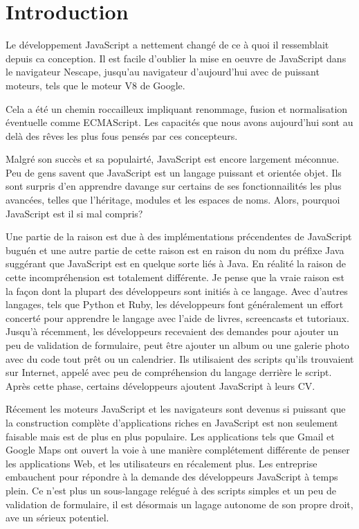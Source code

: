 \chapter{Introduction}
\label{ch:introduction}

Le développement JavaScript a nettement changé de ce à quoi il ressemblait depuis ca conception. Il est facile d’oublier la mise en oeuvre de JavaScript dans le navigateur Nescape, jusqu’au navigateur d’aujourd’hui avec de puissant moteurs, tels que le moteur V8 de Google.

Cela a été un chemin roccailleux impliquant renommage, fusion et normalisation éventuelle comme ECMAScript. Les capacités que nous avons aujourd’hui sont au delà des rêves les plus fous pensés par ces concepteurs.

Malgré son succès et sa populairté, JavaScript est encore largement méconnue. Peu de gens savent que JavaScript est un langage puissant et orientée objet. Ils sont surpris d’en apprendre davange sur certains de ses fonctionnailités les plus avancées, telles que l’héritage, modules et les espaces de noms. Alors, pourquoi JavaScript est il si mal compris?

Une partie de la raison est due à des implémentations précendentes de JavaScript buguén et une autre partie de cette raison est en raison du nom du préfixe Java suggérant que JavaScript est en quelque sorte liés à Java. En réalité la raison de cette incompréhension est totalement différente. Je pense que la vraie raison est la façon dont la plupart des développeurs sont initiés à ce langage. Avec d’autres langages, tels que Python et Ruby, les développeurs font généralement un effort concerté pour apprendre le langage avec l’aide de livres, screencasts et tutoriaux. Jusqu’à récemment, les développeurs recevaient des demandes pour ajouter un peu de validation de formulaire, peut être ajouter un album ou une galerie photo avec du code tout prêt ou un calendrier.  Ils utilisaient des scripts qu’ils trouvaient sur Internet, appelé avec peu de compréhension du langage derrière le script. Après cette phase, certains développeurs ajoutent JavaScript à leurs CV.

Récement les moteurs JavaScript et les navigateurs sont devenus si puissant que la construction complète d’applications riches en JavaScript est non seulement faisable mais est de plus en plus populaire. Les applications tels que Gmail et Google Maps ont ouvert la voie à une manière complétement différente de penser les applications Web, et les utilisateurs en récalement plus. Les entreprise embauchent pour répondre à la demande des développeurs JavaScript à temps plein. Ce n’est plus un sous-langage relégué à des scripts simples et un peu de validation de formulaire, il est désormais un lagage autonome de son propre droit, ave un sérieux potentiel.

